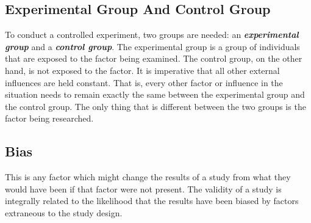 \documentclass[12pt]{article}
\begin{document}
\subsection*{Experimental Group And Control Group}

To conduct a controlled experiment, two groups are needed: an \textit{\textbf{experimental group}} and a \textit{\textbf{control group}}. The experimental group is a group of individuals that are exposed to the factor being examined. The control group, on the other hand, is not exposed to the factor. It is imperative that all other external influences are held constant. That is, every other factor or influence in the situation needs to remain exactly the same between the experimental group and the control group. The only thing that is different between the two groups is the factor being researched.

\subsection*{Bias}
This is any factor which might change the results of a study from what they would have been if that factor were not present. The validity of a study is integrally related to the likelihood that the results have been biased by factors extraneous to the study design.
\end{document}
